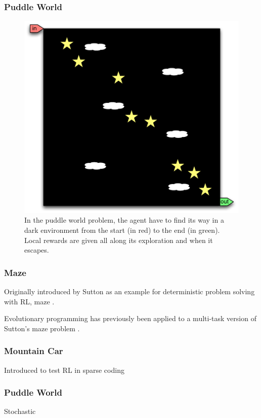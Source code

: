 \subsubsection{Puddle World}
\begin{figure}
\center
\includegraphics[width=0.75\linewidth]{PW_problem.pdf}
\caption{In the puddle world problem, the agent have to find its way in a dark environment from the start (in red) to the end (in green). Local rewards are given all along its exploration and when it escapes.}\label{fig:MC:problem}
\end{figure}

\subsubsection{Maze}

Originally introduced by Sutton as an example for deterministic problem solving with RL, maze \cite{Sutton1990}.

Evolutionary programming has previously been applied to a multi-task version of Sutton's maze problem \cite{Handa2007}.

\subsubsection{Mountain Car}

Introduced to test RL in sparse coding \cite{sutton1996generalization}

\subsubsection{Puddle World}

Stochastic

